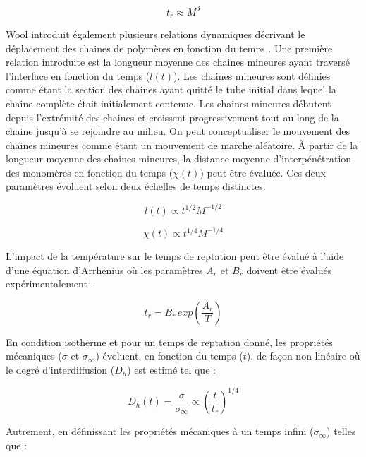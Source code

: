 \begin{equation}
t_r \approx M^3
\end{equation}

Wool introduit également plusieurs relations dynamiques décrivant le déplacement des chaines de polymères en fonction du temps \cite{Wool1983,Wool1989}. 
Une première relation introduite est la longueur moyenne des chaines mineures ayant traversé l'interface en fonction du temps ($l(t)$). 
Les chaines mineures sont définies comme étant la section des chaines ayant quitté le tube initial dans lequel la chaine complète était initialement contenue. 
Les chaines mineures débutent depuis l'extrémité des chaines et croissent progressivement tout au long de la chaine jusqu'à se rejoindre au milieu. 
On peut conceptualiser le mouvement des chaines mineures comme étant un mouvement de marche aléatoire. 
À partir de la longueur moyenne des chaines mineures, la distance moyenne d'interpénétration des monomères en fonction du temps ($\chi(t)$) peut être évaluée. 
Ces deux paramètres évoluent selon deux échelles de temps distinctes. 

\begin{equation}
l(t) \propto t^{1/2} M^{-1/2}
\end{equation}

\begin{equation}
\chi(t) \propto t^{1/4} M^{-1/4}
\end{equation}

L'impact de la température sur le temps de reptation peut être évalué à l'aide d'une équation d'Arrhenius où les paramètres $A_r$ et $B_r$  doivent être évalués expérimentalement \cite{Bastien1991,Ageorges1998}. 

\begin{equation}
t_r = B_r \, exp \left( \frac{A_r}{T} \right)
\end{equation}

En condition isotherme et pour un temps de reptation donné, les propriétés mécaniques ($\sigma$ et $\sigma_{\infty}$) évoluent, en fonction du temps ($t$), de façon non linéaire où le degré d'interdiffusion ($D_{h}$) est estimé tel que \cite{F.Yang2002} : 

\begin{equation}
D_h \left( t \right) = \frac{\sigma}{\sigma_{\infty}} \propto \left( \frac{t}{t_r} \right)^{1/4}
\end{equation}

Autrement, en définissant les propriétés mécaniques à un temps infini ($\sigma_{\infty}$) telles que \cite{Wool1983} :

